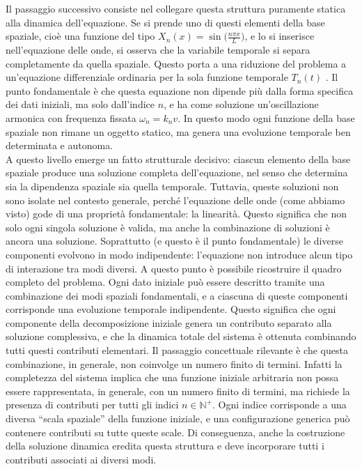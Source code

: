 \documentclass[a4paper,12pt]{report}
\begin{document}
Il passaggio successivo consiste nel collegare questa struttura puramente statica alla dinamica dell’equazione. Se si prende uno di questi elementi della base spaziale, cioè una funzione del tipo $X_n(x)=\sin\bigg(\frac{n\pi x}{L}\bigg)$, e lo si inserisce nell’equazione delle onde, si osserva che la variabile temporale si separa completamente da quella spaziale. Questo porta a una riduzione del problema a un’equazione differenziale ordinaria per la sola funzione temporale $T_n(t)$ . Il punto fondamentale è che questa equazione non dipende più dalla forma specifica dei dati iniziali, ma solo dall’indice $n$, e ha come soluzione un’oscillazione armonica con frequenza fissata $\omega_n=k_nv$. In questo modo ogni funzione della base spaziale non rimane un oggetto statico, ma genera una evoluzione temporale ben determinata e autonoma.
\\A questo livello emerge un fatto strutturale decisivo: ciascun elemento della base spaziale produce una soluzione completa dell’equazione, nel senso che determina sia la dipendenza spaziale sia quella temporale. Tuttavia, queste soluzioni non sono isolate nel contesto generale, perché l’equazione delle onde (come abbiamo visto) gode di una proprietà fondamentale: la linearità. Questo significa che non solo ogni singola soluzione è valida, ma anche la combinazione di soluzioni è ancora una soluzione. Soprattutto (e questo è il punto fondamentale) le diverse componenti evolvono in modo indipendente: l’equazione non introduce alcun tipo di interazione tra modi diversi. A questo punto è possibile ricostruire il quadro completo del problema. Ogni dato iniziale può essere descritto tramite una combinazione dei modi spaziali fondamentali, e a ciascuna di queste componenti corrisponde una evoluzione temporale indipendente. Questo significa che ogni componente della decomposizione iniziale genera un contributo separato alla soluzione complessiva, e che la dinamica totale del sistema è ottenuta combinando tutti questi contributi elementari.
Il passaggio concettuale rilevante è che questa combinazione, in generale, non coinvolge un numero finito di termini. Infatti la completezza del sistema implica che una funzione iniziale arbitraria non possa essere rappresentata, in generale, con un numero finito di termini, ma richiede la presenza di contributi per tutti gli indici $n\in \mathbb{N}^+$. Ogni indice corrisponde a una diversa “scala spaziale” della funzione iniziale, e una configurazione generica può contenere contributi su tutte queste scale. Di conseguenza, anche la costruzione della soluzione dinamica eredita questa struttura e deve incorporare tutti i contributi associati ai diversi modi.
\end{document}
